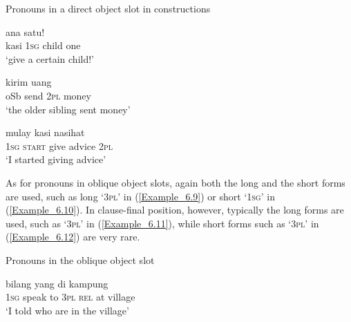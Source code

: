 \begin{styleExampleTitle}
Pronouns in a direct object slot in  constructions
\end{styleExampleTitle}

\ea
\label{Example_6.6}
 {} {ana} {satu!}\\ %
 kasi  \textsc{1sg}  child  one\\

\glt
‘give  a certain child!’ \textstyleExampleSource{[081006-024-CvEx.0030]}
\z

\ea
\label{Example_6.7}
 {kirim} {} {uang}\\ %
 oSb  send  \textsc{2pl}  money\\

\glt
‘the older sibling sent  money’ \textstyleExampleSource{[080922-001a-CvPh.0860]}
\z

\ea
\label{Example_6.8}
 {mulay} {kasi} {nasihat} {}\\ %
 \textsc{1sg}  \textsc{start}  give  advice  \textsc{2pl}\\

\glt
‘I started giving  advice’ \textstyleExampleSource{[081115-001a-Cv.0100]}
\z



As for pronouns in oblique object slots, again both the long and the short  forms are used, such as long  ‘\textsc{3pl}’ in (\ref{Example_6.9}) or short  ‘\textsc{1sg}’ in (\ref{Example_6.10}). In clause-final position, however, typically the long  forms are used, such as  ‘\textsc{3pl}’ in (\ref{Example_6.11}), while short  forms such as  ‘\textsc{3pl}’ in (\ref{Example_6.12}) are very rare.



\begin{styleExampleTitle}
Pronouns in the oblique object slot
\end{styleExampleTitle}

\ea
\label{Example_6.9}
 {bilang} {} {} {yang} {di} {kampung}\\ %
 \textsc{1sg}  speak  to  \textsc{3pl}  \textsc{rel}  at  village\\

\glt
‘I told  who are in the village’ \textstyleExampleSource{[080919-001-Cv.0157]}
\z

